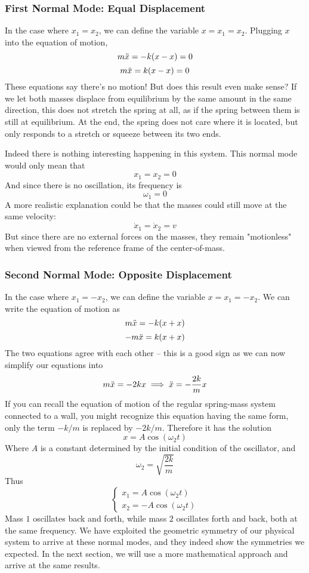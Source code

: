 \documentclass[11pt]{article}
\theoremstyle{gangnamstyle}{\newtheorem{definition}{Definition}[]}
\theoremstyle{gangnamstyle}{\newtheorem{example}{Example}[]}
\theoremstyle{gangnamstyle}{\newtheorem{problem}{Problem}[]}
\theoremstyle{gangnamstyle}{\newtheorem{warning}{Warning}[]}
\begin{document}
\subsubsection{First Normal Mode: Equal Displacement}

In the case where $x_1 = x_2$, we can define the variable $x = x_1 = x_2$. Plugging $x$ into the equation of motion, 
\[ m\Ddot{x} = -k(x - x) = 0 \]
\[ m\Ddot{x} = k(x - x) = 0 \]
These equations say there's no motion! But does this result even make sense? If we let both masses displace from equilibrium by the same amount in the same direction, this does not stretch the spring at all, as if the spring between them is still at equilibrium. At the end, the spring does not care where it is located, but only responds to a stretch or squeeze between its two ends. 

Indeed there is nothing interesting happening in this system. This normal mode would only mean that
\[ x_1 = x_2 = 0 \]
And since there is no oscillation, its frequency is
\[ \omega_1 = 0 \]
A more realistic explanation could be that the masses could still move at the same velocity:
\[ \Dot{x}_1 = \Dot{x}_2 = v \]
But since there are no external forces on the masses, they remain "motionless" when viewed from the reference frame of the center-of-mass. 

\subsubsection{Second Normal Mode: Opposite Displacement}

In the case where $x_1 = -x_2$, we can define the variable $x = x_1 = -x_2$. We can write the equation of motion as
\[ m\Ddot{x} = -k(x + x) \]
\[ -m\Ddot{x} = k(x + x) \]
The two equations agree with each other -- this is a good sign as we can now simplify our equations into
\[ m\Ddot{x} = -2kx \implies \Ddot{x} = -\frac{2k}{m}x \]
If you can recall the equation of motion of the regular spring-mass system connected to a wall, you might recognize this equation having the same form, only the term $-k / m$ is replaced by $-2k / m$. Therefore it has the solution
\[ x = A\cos(\omega_2 t) \]
Where $A$ is a constant determined by the initial condition of the oscillator, and 
\[ \omega_2 = \sqrt{\frac{2k}{m}} \]
Thus
\[ \begin{cases}
x_1 = A\cos(\omega_2 t) \\
x_2 = - A\cos(\omega_2 t)
\end{cases} \]
Mass $1$ oscillates back and forth, while mass $2$ oscillates forth and back, both at the same frequency. We have exploited the geometric symmetry of our physical system to arrive at these normal modes, and they indeed show the symmetries we expected. In the next section, we will use a more mathematical approach and arrive at the same results. \\
\end{document}
